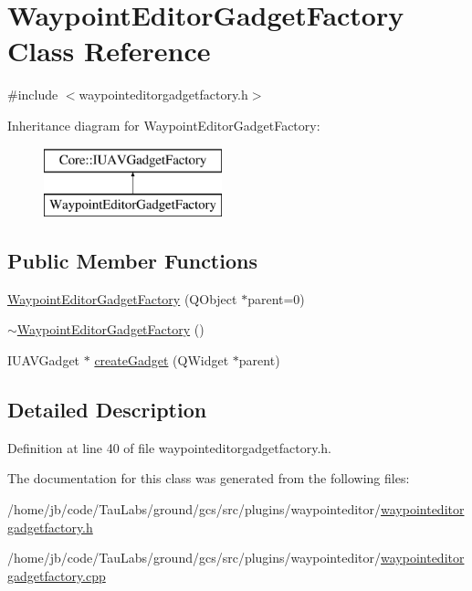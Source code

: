 \hypertarget{class_waypoint_editor_gadget_factory}{\section{\-Waypoint\-Editor\-Gadget\-Factory \-Class \-Reference}
\label{class_waypoint_editor_gadget_factory}
}


{\ttfamily \#include $<$waypointeditorgadgetfactory.\-h$>$}

\-Inheritance diagram for \-Waypoint\-Editor\-Gadget\-Factory\-:\begin{figure}[H]
\begin{center}
\leavevmode
\includegraphics[height=2.000000cm]{class_waypoint_editor_gadget_factory}
\end{center}
\end{figure}
\subsection*{\-Public \-Member \-Functions}
\begin{DoxyCompactItemize}
\item 
\hyperlink{group___waypoint_editor_gadget_plugin_ga270c7e089d8d3807f3f5039dd3191327}{\-Waypoint\-Editor\-Gadget\-Factory} (\-Q\-Object $\ast$parent=0)
\item 
\hyperlink{group___waypoint_editor_gadget_plugin_ga07a37c82dbc7c93b742ed17eac5b6ce4}{$\sim$\-Waypoint\-Editor\-Gadget\-Factory} ()
\item 
\-I\-U\-A\-V\-Gadget $\ast$ \hyperlink{group___waypoint_editor_gadget_plugin_ga542eee5447d62625cd21c9f57e20a8cb}{create\-Gadget} (\-Q\-Widget $\ast$parent)
\end{DoxyCompactItemize}


\subsection{\-Detailed \-Description}


\-Definition at line 40 of file waypointeditorgadgetfactory.\-h.



\-The documentation for this class was generated from the following files\-:\begin{DoxyCompactItemize}
\item 
/home/jb/code/\-Tau\-Labs/ground/gcs/src/plugins/waypointeditor/\hyperlink{waypointeditorgadgetfactory_8h}{waypointeditorgadgetfactory.\-h}\item 
/home/jb/code/\-Tau\-Labs/ground/gcs/src/plugins/waypointeditor/\hyperlink{waypointeditorgadgetfactory_8cpp}{waypointeditorgadgetfactory.\-cpp}\end{DoxyCompactItemize}
